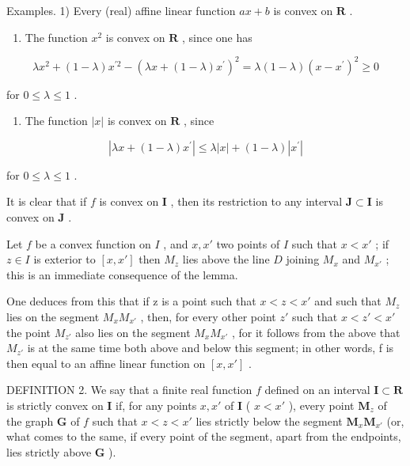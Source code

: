 Examples. 1) Every (real) affine linear function \(ax + b\) is convex on \(\mathbf{R}\) .

\begin{enumerate}
\def\labelenumi{\arabic{enumi})}
\setcounter{enumi}{1}
\tightlist
\item
  The function \(x^{2}\) is convex on \(\mathbf{R}\) , since one has
\end{enumerate}

\[
\lambda x ^ {2} + (1 - \lambda) x ^ {\prime 2} - \left(\lambda x + (1 - \lambda) x ^ {\prime}\right) ^ {2} = \lambda (1 - \lambda) (x - x ^ {\prime}) ^ {2} \geqslant 0
\]

for \(0 \leqslant \lambda \leqslant 1\) .

\begin{enumerate}
\def\labelenumi{\arabic{enumi})}
\setcounter{enumi}{2}
\tightlist
\item
  The function \(|x|\) is convex on \(\mathbf{R}\) , since
\end{enumerate}

\[
\left| \lambda x + (1 - \lambda) x ^ {\prime} \right| \leqslant \lambda | x | + (1 - \lambda) \left| x ^ {\prime} \right|
\]

for \(0 \leqslant \lambda \leqslant 1\) .

It is clear that if \(f\) is convex on \(\mathbf{I}\) , then its restriction to any interval \(\mathbf{J} \subset \mathbf{I}\) is convex on \(\mathbf{J}\) .

Let \(f\) be a convex function on \(I\) , and \(x, x'\) two points of \(I\) such that \(x < x'\) ; if \(z \in I\) is exterior to \([x, x']\) then \(M_z\) lies above the line \(D\) joining \(M_x\) and \(M_{x'}\) ; this is an immediate consequence of the lemma.

One deduces from this that if z is a point such that \(x < z < x'\) and such that \(M_{z}\) lies on the segment \(M_{x}M_{x'}\) , then, for every other point \(z'\) such that \(x < z' < x'\) the point \(M_{z'}\) also lies on the segment \(M_{x}M_{x'}\) , for it follows from the above that \(M_{z'}\) is at the same time both above and below this segment; in other words, f is then equal to an affine linear function on \([x, x']\) .

DEFINITION 2. We say that a finite real function \(f\) defined on an interval \(\mathbf{I} \subset \mathbf{R}\) is strictly convex on \(\mathbf{I}\) if, for any points \(x, x'\) of \(\mathbf{I}\) ( \(x < x'\) ), every point \(\mathbf{M}_z\) of the graph \(\mathbf{G}\) of \(f\) such that \(x < z < x'\) lies strictly below the segment \(\mathbf{M}_x\mathbf{M}_{x'}\) (or, what comes to the same, if every point of the segment, apart from the endpoints, lies strictly above \(\mathbf{G}\) ).

